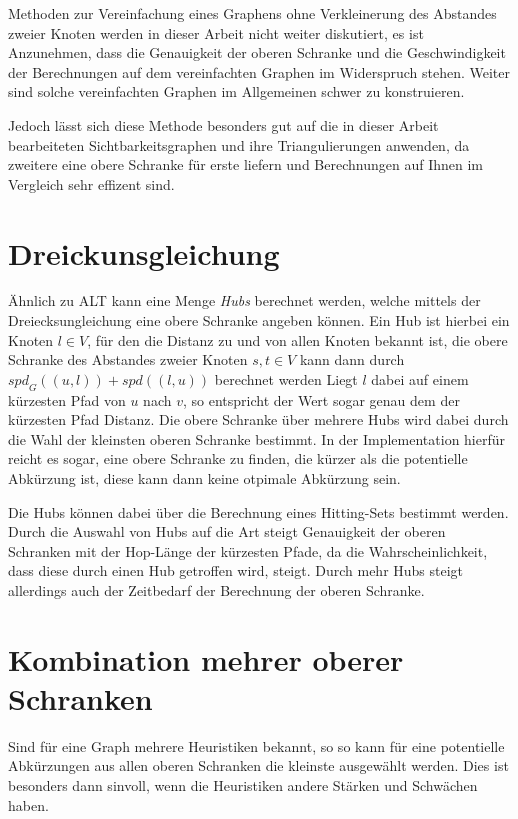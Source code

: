 Methoden zur Vereinfachung eines Graphens ohne Verkleinerung des Abstandes zweier Knoten werden in dieser Arbeit nicht weiter diskutiert, es ist Anzunehmen, dass die Genauigkeit der oberen Schranke und die Geschwindigkeit der Berechnungen auf dem vereinfachten Graphen im Widerspruch stehen.
Weiter sind solche vereinfachten Graphen im Allgemeinen schwer zu konstruieren.

Jedoch lässt sich diese Methode besonders gut auf die in dieser Arbeit bearbeiteten Sichtbarkeitsgraphen und ihre Triangulierungen anwenden, da zweitere eine obere Schranke für erste liefern und Berechnungen auf Ihnen im Vergleich sehr effizent sind.

\section{Dreickunsgleichung}
Ähnlich zu ALT\cite{goldberg2005computing} kann eine Menge \emph{Hubs} berechnet werden, welche mittels der Dreiecksungleichung eine obere Schranke angeben können.
Ein Hub ist hierbei ein Knoten $l \in V$, für den die Distanz zu und von allen Knoten bekannt ist, die obere Schranke des Abstandes zweier Knoten $s, t \in V$ kann dann durch ${spd}_G ((u, l)) + {spd}((l, u))$ berechnet werden
Liegt $l$ dabei auf einem kürzesten Pfad von $u$ nach $v$, so entspricht der Wert sogar genau dem der kürzesten Pfad Distanz.
Die obere Schranke über mehrere Hubs wird dabei durch die Wahl der kleinsten oberen Schranke bestimmt.
In der Implementation hierfür reicht es sogar, eine obere Schranke zu finden, die kürzer als die potentielle Abkürzung ist, diese kann dann keine otpimale Abkürzung sein.

Die Hubs können dabei über die Berechnung eines Hitting-Sets bestimmt werden.
Durch die Auswahl von Hubs auf die Art steigt Genauigkeit der oberen Schranken mit der Hop-Länge der kürzesten Pfade, da die Wahrscheinlichkeit, dass diese durch einen Hub getroffen wird, steigt.
Durch mehr Hubs steigt allerdings auch der Zeitbedarf der Berechnung der oberen Schranke.

\section{Kombination mehrer oberer Schranken}
Sind für eine Graph mehrere Heuristiken bekannt, so so kann für eine potentielle Abkürzungen aus allen oberen Schranken die kleinste ausgewählt werden.
Dies ist besonders dann sinvoll, wenn die Heuristiken andere Stärken und Schwächen haben.

